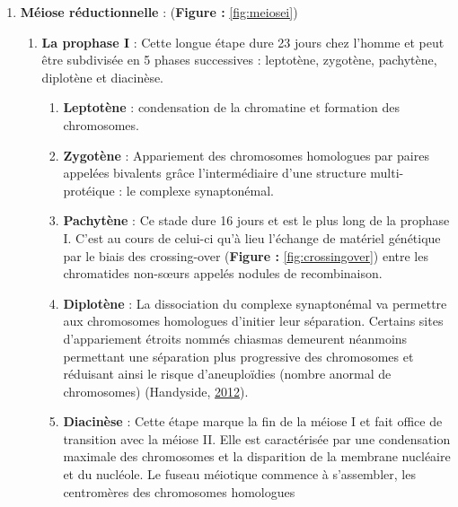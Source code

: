 \documentclass[12pt,twoside]{reedthesis}
\providecommand{\tightlist}{%
  \setlength{\itemsep}{0pt}\setlength{\parskip}{0pt}}
\theoremstyle{definition}
\theoremstyle{definition}
\theoremstyle{remark}
\begin{document}
  \begin{enumerate}
  \def\labelenumi{\arabic{enumi}.}
  \tightlist
  \item
    \textbf{Méiose réductionnelle} : (\textbf{Figure : }\ref{fig:meiosei})
  
    \begin{enumerate}
    \def\labelenumii{\alph{enumii}.}
    \tightlist
    \item
      \textbf{La prophase I} : Cette longue étape dure 23 jours chez
      l'homme et peut être subdivisée en 5 phases successives : leptotène,
      zygotène, pachytène, diplotène et diacinèse.
  
      \begin{enumerate}
      \def\labelenumiii{\roman{enumiii}.}
      \tightlist
      \item
        \textbf{Leptotène} : condensation de la chromatine et formation
        des chromosomes.\\
      \item
        \textbf{Zygotène} : Appariement des chromosomes homologues par
        paires appelées bivalents grâce l'intermédiaire d'une structure
        multi-protéique : le complexe synaptonémal.\\
      \item
        \textbf{Pachytène} : Ce stade dure 16 jours et est le plus long de
        la prophase I. C'est au cours de celui-ci qu'à lieu l'échange de
        matériel génétique par le biais des crossing-over (\textbf{Figure
        : }\ref{fig:crossingover}) entre les chromatides non-sœurs appelés
        nodules de recombinaison.\\
      \item
        \textbf{Diplotène} : La dissociation du complexe synaptonémal va
        permettre aux chromosomes homologues d'initier leur séparation.
        Certains sites d'appariement étroits nommés chiasmas demeurent
        néanmoins permettant une séparation plus progressive des
        chromosomes et réduisant ainsi le risque d'aneuploïdies (nombre
        anormal de chromosomes) (Handyside,
        \protect\hyperlink{ref-Handyside2012}{2012}).\\
      \item
        \textbf{Diacinèse} : Cette étape marque la fin de la méiose I et
        fait office de transition avec la méiose II. Elle est caractérisée
        par une condensation maximale des chromosomes et la disparition de
        la membrane nucléaire et du nucléole. Le fuseau méiotique commence
        à s'assembler, les centromères des chromosomes homologues

\end{enumerate}
\end{enumerate}
\end{enumerate}
\end{document}
